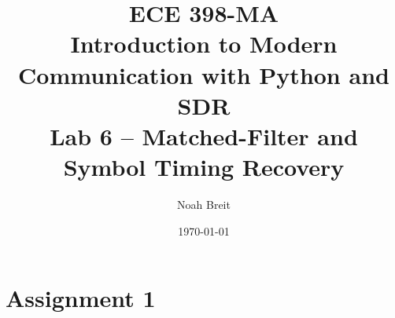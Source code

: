 \documentclass[
	letterpaper, %
	10pt, %
]{CSUniSchoolLabReport}
\title{ECE 398-MA \\ Introduction to Modern Communication with Python and SDR \\ Lab 6 -- Matched-Filter and Symbol Timing Recovery} %
\author{Noah Breit} %
\date{\today} %
\begin{document}
\maketitle %




\section{Assignment 1}
\end{document}
